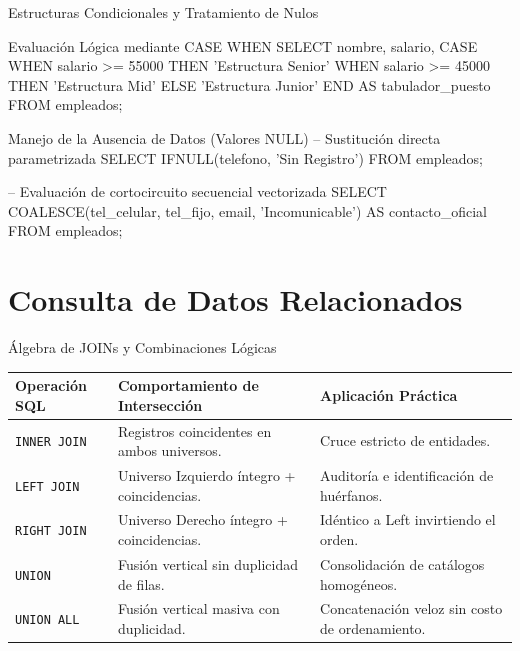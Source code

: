 \documentclass[12pt, aspectratio=169, UTF8]{beamer}
\begin{document}
\begin{frame}[fragile]{Estructuras Condicionales y Tratamiento de Nulos}
  \begin{sqlbox}{Evaluación Lógica mediante CASE WHEN}
SELECT nombre, salario,
       CASE 
            WHEN salario >= 55000 THEN 'Estructura Senior'
            WHEN salario >= 45000 THEN 'Estructura Mid'
            ELSE 'Estructura Junior'
       END AS tabulador_puesto
FROM empleados;
  \end{sqlbox}
  \vspace{4pt}
  \begin{sqlbox}{Manejo de la Ausencia de Datos (Valores NULL)}
-- Sustitución directa parametrizada
SELECT IFNULL(telefono, 'Sin Registro') FROM empleados;

-- Evaluación de cortocircuito secuencial vectorizada
SELECT COALESCE(tel_celular, tel_fijo, email, 'Incomunicable') AS contacto_oficial
FROM empleados;
  \end{sqlbox}
\end{frame}

\section{Consulta de Datos Relacionados}

\begin{frame}{Álgebra de JOINs y Combinaciones Lógicas}
  \begin{center}
  \small
  \renewcommand{\arraystretch}{1.2}
  \begin{tabularx}{0.95\textwidth}{@{} l X l @{}}
    \toprule
    \textbf{Operación SQL} & \textbf{Comportamiento de Intersección} & \textbf{Aplicación Práctica} \\
    \midrule
    \texttt{INNER JOIN}  & Registros coincidentes en ambos universos. & Cruce estricto de entidades. \\
    \texttt{LEFT JOIN}   & Universo Izquierdo íntegro + coincidencias. & Auditoría e identificación de huérfanos. \\
    \texttt{RIGHT JOIN}  & Universo Derecho íntegro + coincidencias.  & Idéntico a Left invirtiendo el orden. \\
    \texttt{UNION}       & Fusión vertical sin duplicidad de filas.  & Consolidación de catálogos homogéneos. \\
    \texttt{UNION ALL}   & Fusión vertical masiva con duplicidad.    & Concatenación veloz sin costo de ordenamiento. \\
    \bottomrule
  \end{tabularx}
  \end{center}
\end{frame}
\end{document}
